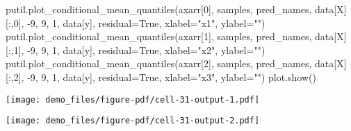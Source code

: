 \documentclass[
  letterpaper,
  DIV=11,
  numbers=noendperiod]{scrartcl}
\newenvironment{Shaded}{\begin{snugshade}}{\end{snugshade}}
\newcommand{\DecValTok}[1]{\textcolor[rgb]{0.68,0.00,0.00}{#1}}
\newcommand{\NormalTok}[1]{\textcolor[rgb]{0.00,0.23,0.31}{#1}}
\newcommand{\OperatorTok}[1]{\textcolor[rgb]{0.37,0.37,0.37}{#1}}
\newcommand{\StringTok}[1]{\textcolor[rgb]{0.13,0.47,0.30}{#1}}
\newcommand{\VariableTok}[1]{\textcolor[rgb]{0.07,0.07,0.07}{#1}}
\begin{document}
\begin{Shaded}
\begin{Highlighting}[]
\NormalTok{putil.plot\_conditional\_mean\_quantiles(axarr[}\DecValTok{0}\NormalTok{], samples, pred\_names,}
\NormalTok{                                      data[}\StringTok{\textquotesingle{}X\textquotesingle{}}\NormalTok{][:,}\DecValTok{0}\NormalTok{], }\OperatorTok{{-}}\DecValTok{9}\NormalTok{, }\DecValTok{9}\NormalTok{, }\DecValTok{1}\NormalTok{,}
\NormalTok{                                      data[}\StringTok{\textquotesingle{}y\textquotesingle{}}\NormalTok{], residual}\OperatorTok{=}\VariableTok{True}\NormalTok{,}
\NormalTok{                                      xlabel}\OperatorTok{=}\StringTok{"x1"}\NormalTok{, ylabel}\OperatorTok{=}\StringTok{""}\NormalTok{)}
\NormalTok{putil.plot\_conditional\_mean\_quantiles(axarr[}\DecValTok{1}\NormalTok{], samples, pred\_names,}
\NormalTok{                                      data[}\StringTok{\textquotesingle{}X\textquotesingle{}}\NormalTok{][:,}\DecValTok{1}\NormalTok{], }\OperatorTok{{-}}\DecValTok{9}\NormalTok{, }\DecValTok{9}\NormalTok{, }\DecValTok{1}\NormalTok{,}
\NormalTok{                                      data[}\StringTok{\textquotesingle{}y\textquotesingle{}}\NormalTok{], residual}\OperatorTok{=}\VariableTok{True}\NormalTok{,}
\NormalTok{                                      xlabel}\OperatorTok{=}\StringTok{"x2"}\NormalTok{, ylabel}\OperatorTok{=}\StringTok{""}\NormalTok{)}
\NormalTok{putil.plot\_conditional\_mean\_quantiles(axarr[}\DecValTok{2}\NormalTok{], samples, pred\_names,}
\NormalTok{                                      data[}\StringTok{\textquotesingle{}X\textquotesingle{}}\NormalTok{][:,}\DecValTok{2}\NormalTok{], }\OperatorTok{{-}}\DecValTok{9}\NormalTok{, }\DecValTok{9}\NormalTok{, }\DecValTok{1}\NormalTok{,}
\NormalTok{                                      data[}\StringTok{\textquotesingle{}y\textquotesingle{}}\NormalTok{], residual}\OperatorTok{=}\VariableTok{True}\NormalTok{,}
\NormalTok{                                      xlabel}\OperatorTok{=}\StringTok{"x3"}\NormalTok{, ylabel}\OperatorTok{=}\StringTok{""}\NormalTok{)}
\NormalTok{plot.show()}
\end{Highlighting}
\end{Shaded}

\texttt{[image: demo\_files/figure-pdf/cell-31-output-1.pdf]}

\texttt{[image: demo\_files/figure-pdf/cell-31-output-2.pdf]}
\end{document}
